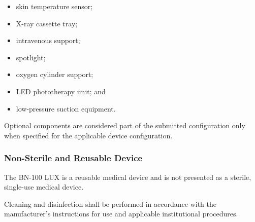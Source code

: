 \begin{itemize}
    \item skin temperature sensor;
    \item X-ray cassette tray;
    \item intravenous support;
    \item spotlight;
    \item oxygen cylinder support;
    \item LED phototherapy unit; and
    \item low-pressure suction equipment.
\end{itemize}

Optional components are considered part of the submitted
configuration only when specified for the applicable device
configuration.


\subsubsection{Non-Sterile and Reusable Device}

The BN-100 LUX is a reusable medical device and is not presented
as a sterile, single-use medical device.

Cleaning and disinfection shall be performed in accordance with
the manufacturer's instructions for use and applicable institutional
procedures.

